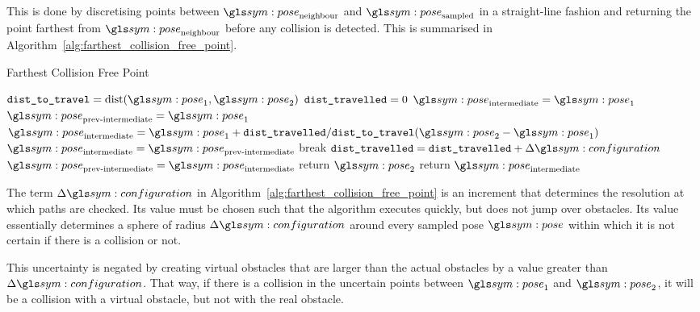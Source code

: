 		This is done by discretising points between $\pose_\text{neighbour}$ and
		$\pose_\text{sampled}$ in a straight-line fashion and returning the
		point farthest from $\pose_\text{neighbour}$ before any collision is
		detected. This is summarised in
		Algorithm~\ref{alg:farthest_collision_free_point}.

		\begin{algorithm}[ht]
			\caption{Farthest Collision Free Point}%
			\label{alg:farthest_collision_free_point}
			\begin{algorithmic}[1]
					\State{}$\code{dist\_to\_travel} = \dist(\pose_1, \pose_2)$
					\State{}$\texttt{dist\_travelled} = 0$
					\State{}$\pose_\text{intermediate} = \pose_1$
					\State{}$\pose_\text{prev-intermediate} = \pose_1$
						\State{}
							\(
								\pose_\text{intermediate} =
								\pose_1 +
								\code{dist\_travelled}/\code{dist\_to\_travel}
								(
									\pose_2 - \pose_1
								)
							\)
							\State{}$\pose_\text{intermediate} =
								\pose_\text{prev-intermediate}$
							\State{}break
						\EndIf{}
						\State{}$\code{dist\_travelled} =
							\code{dist\_travelled} + \Delta\configuration$
						\State{}$\pose_\text{prev-intermediate} =
							\pose_\text{intermediate}$
					\EndWhile{}
						\State{}return $\pose_2$
					\EndIf{}
					\State{}return $\pose_\text{intermediate}$
				\EndProcedure{}
			\end{algorithmic}
		\end{algorithm}

		The term $\Delta\configuration$ in
		Algorithm~\ref{alg:farthest_collision_free_point} is an increment that
		determines the resolution at which paths are checked. Its value must be
		chosen such that the algorithm executes quickly, but does not jump over
		obstacles. Its value essentially determines a sphere of radius
		$\Delta\configuration$ around every sampled pose $\pose$ within which it
		is not certain if there is a collision or not.

		This uncertainty is negated by creating virtual obstacles that are
		larger than the actual obstacles by a value
		greater than $\Delta\configuration$. That way, if there is a collision
		in the uncertain points between $\pose_1$ and $\pose_2$, it will be a
		collision with a virtual obstacle, but not with the real obstacle.

